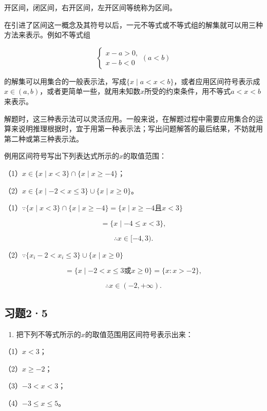 开区间，闭区间，右开区间，左开区间等统称为区间。

在引进了区间这一概念及其符号以后，一元不等式或不等式组的解集就可以用三种方法来表示。例如不等式组

\[
\left\{ \begin{array}{ll} x - a > 0, \\ x - b < 0 \end{array} \right. (a < b)
\]

的解集可以用集合的一般表示法，写成\(\{x \mid a < x < b\}\)，或者应用区间符号表示成\(x \in (a, b)\)，或者更简单一些，就用未知数\(x\)所受的约束条件，用不等式\(a < x < b\)来表示。

解题时，这三种表示法可以灵活应用。一般来说，在解题过程中需要应用集合的运算来说明推理根据时，宜于用第一种表示法；写出问题解答的最后结果，不妨就用第二种或第三种表示法。

例用区间符号写出下列表达式所示的\(x\)的取值范围：

（1）\(x \in \{x \mid x < 3\} \cap \{x \mid x \geqslant -4\}\)；

（2）\(x \in \{x \mid -2 < x \leqslant 3\} \cup \{x \mid x \geqslant 0\}\)。

（1）\(\because \{x \mid x < 3\} \cap \{x \mid x \geqslant -4\} = \{x \mid x \geqslant -4 \text{且} x < 3\}\)

\[
= \{x \mid - 4 \leqslant x < 3 \},
\]

\[
\therefore x \in [ - 4, 3).
\]

（2）\(\because \{x_{i} - 2 < x_{i} \leqslant 3\} \cup \{x \mid x \geqslant 0\}\)

\[
= \{x \mid - 2 < x \leqslant 3 \text{或} x \geqslant 0 \} = \{x: x > - 2 \},
\]

\[
\therefore x \in (- 2, + \infty).
\]

\subsection{习题2·5}

\begin{enumerate}
\item
  把下列不等式所示的\(x\)的取值范围用区间符号表示出来：
\end{enumerate}

（1）\(x < 3\)；

（2）\(x \geqslant -2\)；

（3）\(-3 < x < 3\)；

（4）\(-3 \leqslant x \leqslant 5\)。

